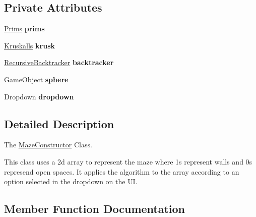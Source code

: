 \subsection*{Private Attributes}
\begin{DoxyCompactItemize}
\item 
\mbox{\label{class_maze_constructor_a32be60572645e3b7c0c280b2656c3976}} 
\mbox{\hyperlink{class_prims}{Prims}} {\bfseries prims}
\item 
\mbox{\label{class_maze_constructor_af51a4a373d66a926ec14d8466774de73}} 
\mbox{\hyperlink{class_kruskalls}{Kruskalls}} {\bfseries krusk}
\item 
\mbox{\label{class_maze_constructor_aef8d596f3b2457bb35b7a2925b39e300}} 
\mbox{\hyperlink{class_recursive_backtracker}{Recursive\+Backtracker}} {\bfseries backtracker}
\item 
\mbox{\label{class_maze_constructor_a9125827376ad00c6e5f4c80ab5b6a04c}} 
Game\+Object {\bfseries sphere}
\item 
\mbox{\label{class_maze_constructor_a7163e515cb1ba14f59d128fc7d88d93d}} 
Dropdown {\bfseries dropdown}
\end{DoxyCompactItemize}


\subsection{Detailed Description}
The \mbox{\hyperlink{class_maze_constructor}{Maze\+Constructor}} Class. 

This class uses a 2d array to represent the maze where 1s represent walls and 0s represend open spaces. It applies the algorithm to the array according to an option selected in the dropdown on the UI. 

\subsection{Member Function Documentation}
\mbox{\label{class_maze_constructor_a335b2f75bf36c705301c114173201231}} 
